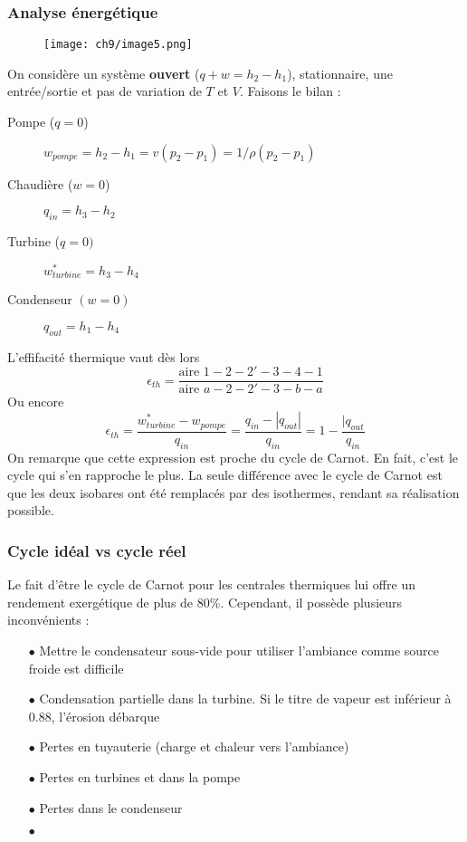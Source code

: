 		\subsubsection{Analyse énergétique}
		\begin{wrapfigure}[8]{r}{4cm}
		\vspace{-5mm}
		\texttt{[image: ch9/image5.png]}
		\end{wrapfigure}
		On considère un système \textbf{ouvert} ($q+w = h_2-h_1$), stationnaire, 
		une entrée/sortie et pas de variation de $T$ et $V$. Faisons le bilan :
		\begin{description}
		\item[Pompe ($q=0$)] $w_{pompe} = h_2-h_1 = v(p_2-p_1)=1/\rho(p_2-p_1)$
		\item[Chaudière ($w=0$)] $q_{in} = h_3-h_2$
		\item[Turbine ($q=0)$] $w_{turbine}^* = h_3-h_4$
		\item[Condenseur $(w=0)$] $q_{out} = h_1-h_4$
		\end{description}
		L'effifacité thermique vaut dès lors 
		\begin{equation}
		\epsilon_{th} = \dfrac{\text{aire } 1-2-2'-3-4-1}{\text{aire } a-2-2'-3-b-a}
		\end{equation}
		Ou encore 
		\begin{equation}
		\epsilon_{th} = \dfrac{w_{turbine}^*-w_{pompe}}{q_{in}} = \dfrac{q_{in}-|q_{out}|}{
		q_{in}} = 1-\dfrac{|q_{out}}{q_{in}}
		\end{equation}
		On remarque que cette expression est proche du cycle de Carnot. En fait, c'est 
		le cycle qui s'en rapproche le plus. La seule différence avec le cycle de Carnot 
		est que les deux isobares ont été remplacés par des isothermes, rendant sa 
		réalisation possible. 
		
		\newpage
		\subsubsection{Cycle idéal vs cycle réel}
		Le fait d’être le cycle de Carnot pour les centrales thermiques lui offre un 
		rendement exergétique de plus de 80\%. Cependant, il possède plusieurs 
		inconvénients :
		\begin{itemize}
		\item[$\bullet$] Mettre le condensateur sous-vide pour utiliser l'ambiance 
		comme source froide est difficile
		\item[$\bullet$] Condensation partielle dans la turbine. Si le titre de 
		vapeur est inférieur à 0.88, l’érosion débarque
		\item[$\bullet$] Pertes en tuyauterie (charge et chaleur vers l'ambiance)
		\item[$\bullet$] Pertes en turbines et dans la pompe
		\item[$\bullet$] Pertes dans le condenseur
		\item[$\bullet$]				
		\end{itemize}
	
